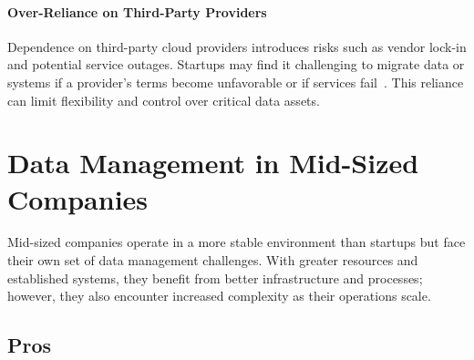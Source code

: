 \documentclass{article}
\begin{document}
\paragraph{Over-Reliance on Third-Party Providers}
Dependence on third-party cloud providers introduces risks such as vendor lock-in and potential service outages. Startups may find it challenging to migrate data or systems if a provider's terms become unfavorable or if services fail~\cite{cloudflare_vendor_lockin}. This reliance can limit flexibility and control over critical data assets.

\section*{Data Management in Mid-Sized Companies}

Mid-sized companies operate in a more stable environment than startups but face their own set of data management challenges. With greater resources and established systems, they benefit from better infrastructure and processes; however, they also encounter increased complexity as their operations scale.

\subsection*{Pros}
\end{document}
